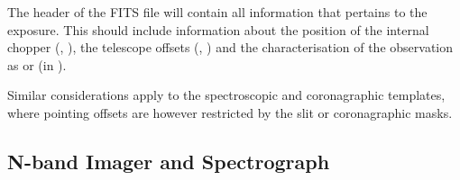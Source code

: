 The header of the FITS file will contain all information that pertains
to the exposure. This should include information about the position of
the internal chopper (,
), the telescope offsets (,
) and the characterisation of the observation as
 or  (in ).

Similar considerations apply to the spectroscopic and coronagraphic
templates, where pointing offsets are however restricted by the slit
or coronagraphic masks.


\subsection{N-band Imager and Spectrograph}
\label{ssec:instrument_data_N-IMG}

